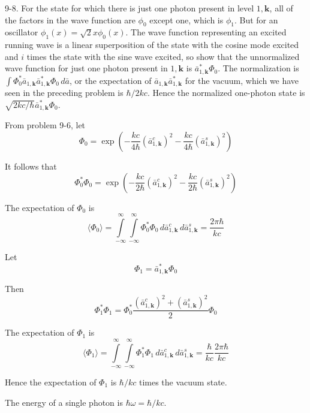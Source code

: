 \documentclass[12pt]{article}
\begin{document}
9-8.
For the state for which there is just one photon
present in level $1,\mathbf k$, all of the factors in the wave function are
$\phi_0$ except one, which is $\phi_1$.
But for an oscillator $\phi_1(x)=\sqrt2x\phi_0(x)$.
The wave function representing an excited running wave is a linear
superposition of the state with the cosine mode excited and $i$
times the state with the sine wave excited, so show that the
unnormalized wave function for just one photon present in
$1,\mathbf k$ is $\bar a_{1,\mathbf k}^*\Phi_0$.
The normalization is
$\int\Phi_0^*\bar a_{1,\mathbf k}\bar a_{1,\mathbf k}^*\Phi_0\,d\bar a$,
or the expectation of $\bar a_{1,\mathbf k}\bar a_{1,\mathbf k}^*$ for the
vacuum, which we have seen in the preceding problem is $\hbar/2kc$.
Hence the normalized one-photon state is
$\sqrt{2kc/\hbar}\bar a_{1,\mathbf k}^*\Phi_0$.

\bigskip
From problem 9-6, let
\begin{equation*}
\Phi_0=\exp\left(-\frac{kc}{4\hbar}(\bar a_{1,\mathbf k}^c)^2-\frac{kc}{4\hbar}(\bar a_{1,\mathbf k}^s)^2\right)
\end{equation*}

It follows that
\begin{equation*}
\Phi_0^*\Phi_0=\exp\left(-\frac{kc}{2\hbar}(\bar a_{1,\mathbf k}^c)^2-\frac{kc}{2\hbar}(\bar a_{1,\mathbf k}^s)^2\right)
\end{equation*}

The expectation of $\Phi_0$ is
\begin{equation*}
\langle\Phi_0\rangle=
\int\limits_{-\infty}^\infty
\int\limits_{-\infty}^\infty
\Phi_0^*\Phi_0
\,d\bar a_{1,\mathbf k}^c\,d\bar a_{1,\mathbf k}^s=\frac{2\pi\hbar}{kc}
\tag{1}
\end{equation*}

Let
\begin{equation*}
\Phi_1=\bar a_{1,\mathbf k}^*\Phi_0
\end{equation*}

Then
\begin{equation*}
\Phi_1^*\Phi_1=\Phi_0^*\frac{(\bar a_{1,\mathbf k}^c)^2+(\bar a_{1,\mathbf k}^s)^2}{2}\Phi_0
\end{equation*}

The expectation of $\Phi_1$ is
\begin{equation*}
\langle\Phi_1\rangle=
\int\limits_{-\infty}^\infty
\int\limits_{-\infty}^\infty
\Phi_1^*\Phi_1
\,d\bar a_{1,\mathbf k}^c\,d\bar a_{1,\mathbf k}^s
=\frac{\hbar}{kc}\frac{2\pi\hbar}{kc}
\tag{2}
\end{equation*}

Hence the expectation of $\Phi_1$ is $\hbar/kc$ times the vacuum state.

\bigskip
The energy of a single photon is $\hbar\omega=\hbar/kc$.
\end{document}
